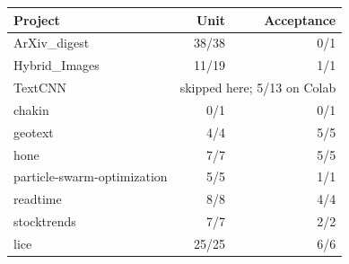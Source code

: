 \begin{tabular}{@{}lrr@{}}
\toprule
Project & Unit & Acceptance \\
\midrule
ArXiv\_digest & 38/38 & 0/1 \\
Hybrid\_Images & 11/19 & 1/1 \\
TextCNN & \multicolumn{2}{l}{skipped here; 5/13 on Colab} \\
chakin & 0/1 & 0/1 \\
geotext & 4/4 & 5/5 \\
hone & 7/7 & 5/5 \\
particle-swarm-optimization & 5/5 & 1/1 \\
readtime & 8/8 & 4/4 \\
stocktrends & 7/7 & 2/2 \\
lice & 25/25 & 6/6 \\
\bottomrule
\end{tabular}

